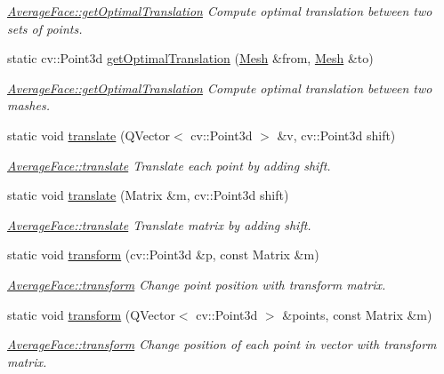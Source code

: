 \begin{DoxyCompactItemize}
\begin{DoxyCompactList}\small\item\em \hyperlink{class_average_face_a6e52724e6f4d6479039256ac5f13585b}{Average\+Face\+::get\+Optimal\+Translation} Compute optimal translation between two sets of points. \end{DoxyCompactList}\item 
static cv\+::\+Point3d \hyperlink{class_average_face_af8d8e3d645cdc9c989977444be9c8f77}{get\+Optimal\+Translation} (\hyperlink{class_mesh}{Mesh} \&from, \hyperlink{class_mesh}{Mesh} \&to)
\begin{DoxyCompactList}\small\item\em \hyperlink{class_average_face_a6e52724e6f4d6479039256ac5f13585b}{Average\+Face\+::get\+Optimal\+Translation} Compute optimal translation between two mashes. \end{DoxyCompactList}\item 
static void \hyperlink{class_average_face_a3e9bfa47bfcac91123244f46d5465fa7}{translate} (Q\+Vector$<$ cv\+::\+Point3d $>$ \&v, cv\+::\+Point3d shift)
\begin{DoxyCompactList}\small\item\em \hyperlink{class_average_face_a3e9bfa47bfcac91123244f46d5465fa7}{Average\+Face\+::translate} Translate each point by adding shift. \end{DoxyCompactList}\item 
static void \hyperlink{class_average_face_aac1b53959eede49d3e9ad7685eb2546d}{translate} (Matrix \&m, cv\+::\+Point3d shift)
\begin{DoxyCompactList}\small\item\em \hyperlink{class_average_face_a3e9bfa47bfcac91123244f46d5465fa7}{Average\+Face\+::translate} Translate matrix by adding shift. \end{DoxyCompactList}\item 
static void \hyperlink{class_average_face_a30a72616982800ec918615a6f63d0afe}{transform} (cv\+::\+Point3d \&p, const Matrix \&m)
\begin{DoxyCompactList}\small\item\em \hyperlink{class_average_face_a30a72616982800ec918615a6f63d0afe}{Average\+Face\+::transform} Change point position with transform matrix. \end{DoxyCompactList}\item 
static void \hyperlink{class_average_face_a7f47bcbd3c54ecd296c4775d1a9ad981}{transform} (Q\+Vector$<$ cv\+::\+Point3d $>$ \&points, const Matrix \&m)
\begin{DoxyCompactList}\small\item\em \hyperlink{class_average_face_a30a72616982800ec918615a6f63d0afe}{Average\+Face\+::transform} Change position of each point in vector with transform matrix. \end{DoxyCompactList}\item 

\end{DoxyCompactItemize}
